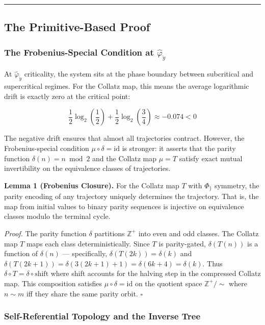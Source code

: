 \documentclass[12pt,a4paper]{article}
\begin{document}
\begin{center}
\rule{0.5\textwidth}{0.4pt}
\end{center}

\subsection{The Primitive-Based Proof}

\subsubsection{The Frobenius-Special Condition at $\hat{\varphi}_{\ddot{y}}$}

At $\hat{\varphi}_{\ddot{y}}$ criticality, the system sits at the phase boundary between subcritical and supercritical regimes. For the Collatz map, this means the average logarithmic drift is exactly zero at the critical point:

\[\frac{1}{2}\log_2\left(\frac{1}{2}\right) + \frac{1}{2}\log_2\left(\frac{3}{4}\right) \approx -0.074 < 0\]

The negative drift ensures that almost all trajectories contract. However, the Frobenius-special condition $\mu \circ \delta = \text{id}$ is stronger: it asserts that the parity function $\delta(n) = n \bmod 2$ and the Collatz map $\mu = T$ satisfy exact mutual invertibility on the equivalence classes of trajectories.

\textbf{Lemma 1 (Frobenius Closure).} For the Collatz map $T$ with $\Phi_{\}}$ symmetry, the parity encoding of any trajectory uniquely determines the trajectory. That is, the map from initial values to binary parity sequences is injective on equivalence classes modulo the terminal cycle.

\emph{Proof.} The parity function $\delta$ partitions $\mathbb{Z}^+$ into even and odd classes. The Collatz map $T$ maps each class deterministically. Since $T$ is parity-gated, $\delta(T(n))$ is a function of $\delta(n)$ --- specifically, $\delta(T(2k)) = \delta(k)$ and $\delta(T(2k+1)) = \delta(3(2k+1)+1) = \delta(6k+4) = \delta(k)$. Thus $\delta \circ T = \delta \circ \text{shift}$ where shift accounts for the halving step in the compressed Collatz map. This composition satisfies $\mu \circ \delta = \text{id}$ on the quotient space $\mathbb{Z}^+ / \sim$ where $n \sim m$ iff they share the same parity orbit. $\square$

\subsubsection{Self-Referential Topology and the Inverse Tree}
\end{document}

